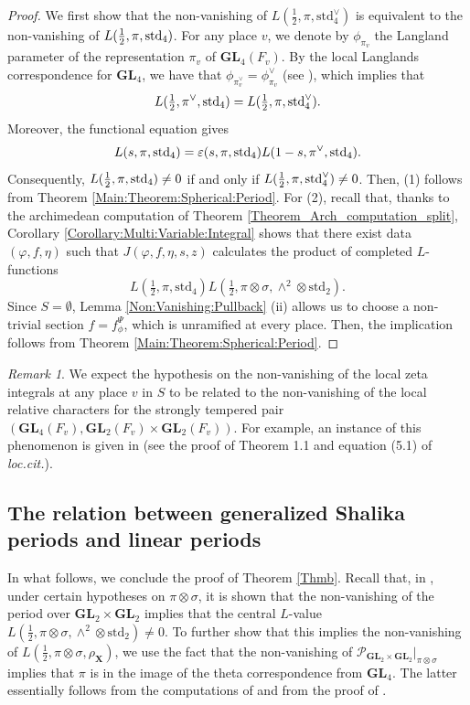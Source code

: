 \documentclass[11pt, reqno]{amsart}
\theoremstyle{plain}
\theoremstyle{definition}
\theoremstyle{remark}
\newtheorem{remark}[theorem]{Remark}
\theoremstyle{plain}
\def\GL{\mathbf{GL}}
\begin{document}
\begin{proof}
    We first show that the non-vanishing of $L( \tfrac{1}{2},\pi,\mathrm{std}_4^{\vee})$ is equivalent to the non-vanishing of $L( \tfrac{1}{2},\pi,{\rm std}_4)$. For any place $v$, we denote by $\phi_{\pi_v}$ the Langland parameter of the representation $\pi_v$ of $\GL_4(F_v)$. By the local Langlands correspondence for $\GL_4$, we have that $\phi_{\pi_v^{\vee}} = \phi_{\pi_v}^{\vee}$ (see \cite[(1.4)]{Adams:Vogan}), which implies that \[L( \tfrac{1}{2},\pi^{\vee},{\rm std}_4) = L( \tfrac{1}{2},\pi,{\rm std}_4^{\vee}).\]
    Moreover, the functional equation gives
    \[L( s,\pi,{\rm std}_4) = \varepsilon(s,\pi,{\rm std}_4)L( 1-s,\pi^{\vee},{\rm std}_4).\]
    Consequently, $L( \tfrac{1}{2},\pi,{\rm std}_4)\neq 0$ if and only if $L( \tfrac{1}{2},\pi,{\rm std}_4^{\vee})\neq 0$. Then,  (1) follows from Theorem \ref{Main:Theorem:Spherical:Period}. For (2), 
recall that, thanks to the archimedean computation of Theorem \ref{Theorem_Arch_computation_split}, Corollary \ref{Corollary:Multi:Variable:Integral} shows that there exist data $(\varphi, f , \eta)$ such that $J(\varphi, f , \eta, s ,z)$ calculates the product of completed $L$-functions $$L( \tfrac{1}{2},\pi,\mathrm{std}_4) L(\tfrac{1}{2},\pi \otimes \sigma,\wedge^2 \otimes \mathrm{std}_2).$$ Since $S = \emptyset$, Lemma \ref{Non:Vanishing:Pullback} (ii) allows us to choose a non-trivial section $f = f^\Psi_\phi$, which is unramified at every place. Then, the implication follows from Theorem \ref{Main:Theorem:Spherical:Period}.
\end{proof}

\begin{remark}
    We expect the hypothesis on the non-vanishing of the local zeta integrals at any place $v$ in $S$ to be related to the non-vanishing of the local relative characters for the strongly tempered pair $(\GL_4(F_v), \GL_2(F_v) \times \GL_2(F_v))$. For example, an instance of this phenomenon is given in \cite{IchinoTriple} (see the proof of Theorem 1.1 and equation (5.1) of \emph{loc.cit.}). 
\end{remark}


\subsection{The relation between generalized Shalika periods and linear periods}

In what follows, we conclude the proof of Theorem \ref{Thmb}. Recall that, in \cite{Pollack:Wan:Zydor}, under certain hypotheses on $\pi \otimes \sigma$, it is shown that the non-vanishing of the period over $\GL_2 \times \GL_2$ implies that the central $L$-value $L(\tfrac{1}{2},\pi \otimes \sigma,\wedge^2 \otimes \mathrm{std}_2)\neq 0$. To further show that this implies the non-vanishing of $L( \tfrac{1}{2}, \pi \otimes \sigma, \rho_{\mathbf{X}})$, we use the fact that the non-vanishing of ${\mathcal{P}_{ \GL_2 \times \GL_2}}|_{\pi \otimes \sigma}$ implies that $\pi$ is in the image of the theta correspondence from $\GL_4$. The latter essentially follows from the computations of \cite[\S 3]{GanPeriodsandTheta} and from the proof of \cite[Proposition 7.1]{Chen-Gan}. 
\end{document}
